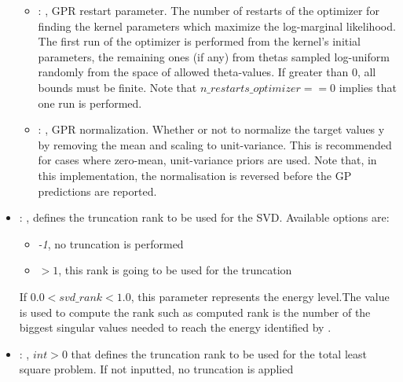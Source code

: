 \begin{itemize}
\begin{itemize}
        \item {}: ,
          GPR restart parameter. The number of restarts of the optimizer for finding the
          kernel parameters which maximize the log-marginal likelihood. The first run of the
          optimizer                                                  is performed from the kernel’s
          initial parameters, the remaining ones (if any) from thetas
          sampled log-uniform randomly from the space of allowed theta-values. If greater than 0,
          all bounds must be finite. Note that $n\_restarts\_optimizer == 0$ implies that one run is
          performed.

        \item {}: ,
          GPR normalization. Whether or not to normalize the target values y by removing the mean
          and scaling                                                  to unit-variance. This is
          recommended for cases where zero-mean, unit-variance priors are used.
          Note that, in this implementation, the normalisation is reversed before the GP predictions
          are reported.
      \end{itemize}

    \item {}: ,
      defines the truncation rank to be used for the SVD.
      Available options are:                                                  \begin{itemize}
      \item \textit{-1}, no truncation is performed
      \item \textit{$>1$}, this rank is going to be used for the truncation
      \end{itemize}                                                  If $0.0 < svd\_rank < 1.0$,
      this parameter represents the energy level.The value is used to compute the rank such
      as computed rank is the number of the biggest singular values needed to reach the energy
      identified by                                                    .

    \item {}: ,
      $int > 0$ that defines the truncation rank to be used for the total
      least square problem. If not inputted, no truncation is applied


\end{itemize}
